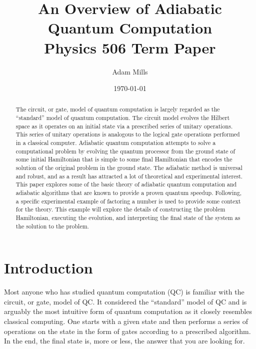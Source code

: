\documentclass[%
 reprint,
 amsmath,amssymb,
 aps,
]{revtex4-1}
\begin{document}

\title{An Overview of Adiabatic Quantum Computation \\ Physics 506 Term Paper}%

\author{Adam Mills}

\date{\today}%

\begin{abstract}
	The circuit, or gate, model of quantum computation is largely regarded as the ``standard'' model of quantum computation. The circuit model evolves the Hilbert space as it operates on an initial state via a prescribed series of unitary operations. This series of unitary operations is analogous to the logical gate operations performed in a classical computer. Adiabatic quantum computation attempts to solve a computational problem by evolving the quantum processor from the ground state of some initial Hamiltonian that is simple to some final Hamiltonian that encodes the solution of the original problem in the ground state. The adiabatic method is universal and robust, and as a result has attracted a lot of theoretical and experimental interest. This paper explores some of the basic theory of adiabatic quantum computation and adiabatic algorithms that are known to provide a proven quantum speedup. Following, a specific experimental example of factoring a number is used to provide some context for the theory. This example will explore the details of constructing the problem Hamiltonian, executing the evolution, and interpreting the final state of the system as the solution to the problem.
\end{abstract}

\maketitle



\section{Introduction}

   Most anyone who has studied quantum computation (QC) is familiar with the circuit, or gate, model of QC\cite{Deutsch73}. It considered the ``standard'' model of QC and is arguably the most intuitive form of quantum computation as it closely resembles classical computing. One starts with a given state and then performs a series of operations on the state in the form of gates according to a prescribed algorithm. In the end, the final state is, more or less, the answer that you are looking for. 
\end{document}
